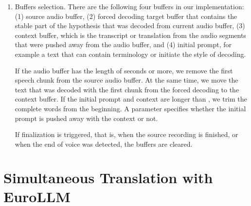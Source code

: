 \documentclass[11pt]{article}
\def\XXX#1{} %
\begin{document}
\begin{enumerate}
    \item Buffers selection. There are the following four buffers in our implementation: (1) source audio buffer, (2) forced decoding target buffer that contains the stable part of the hypothesis that was decoded from current audio buffer, (3) context buffer, which is the transcript or translation from the audio segments that were pushed away from the audio buffer, and (4) initial prompt, for example a text that can contain terminology or initiate the style of decoding.
    
    If the audio buffer has the length of \BufferLen{} seconds or more, we remove the first speech chunk from the source audio buffer. At the same time, we move the text that was decoded with the first chunk from the forced decoding to the context buffer. If the initial prompt and context are longer than \MaxContextLen{}, we trim the complete words from the beginning. A parameter \StaticPrompt{} specifies whether the initial prompt is pushed away with the context or not. %
    
    If finalization is triggered, that is, when the source recording is finished, or when the end of voice was detected, the buffers are cleared. %

\end{enumerate}

\XXX{tady by se mohla hodit tabulka, která by vysvětlila všechny parametry. Ale nestíháme, nebude. \MinChunkSize, \BufferLen, \MaxContextLen, \StaticPrompt, \Frames, \Beams}




\section{Simultaneous Translation with EuroLLM}
\end{document}
